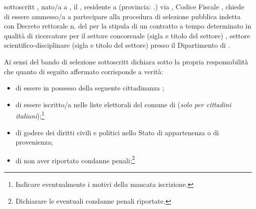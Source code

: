 \documentclass[a4paper,10pt]{article}
\begin{document}
\begin{Form}


\myTextField[.5cm]{} sottoscritt\myTextField[.5cm]{} \myTextField[4cm]{}, 
nato/a a \myTextField{}, il \myTextField{}, residente a \myTextField{} 
(provincia: \myTextField{}.) via \myTextField{}, Codice Fiscale 
\myTextField[4cm]{}, chiede di essere ammesso/a a partecipare alla procedura 
di selezione pubblica indetta con Decreto rettorale n. \myTextField{} del 
\myTextField{} per la stipula di un contratto a tempo determinato in qualità 
di ricercatore per il settore concorsuale (sigla e titolo del settore) \myTextField{}, 
settore scientifico-disciplinare (sigla e titolo  del settore) \myTextField{} 
presso il Dipartimento di \myTextField[4cm]{}.

Ai sensi del bando di selezione  \myTextField[.5cm]{} sottoscritt\myTextField[.5cm]{} 
dichiara sotto la propria responsabilità che quanto di seguito affermato 
corrisponde a verità:
\begin{itemize}
 \item di essere in possesso della seguente cittadinanza \myTextField{};
\item di essere iscritto/a nelle liste elettorali del comune di \myTextField{} 
(\emph{solo per cittadini italiani});\footnote{Indicare eventualmente i motivi 
della mancata iscrizione.}

\myTextField[.9\textwidth]{}
\item di godere dei diritti civili e politici nello Stato di appartenenza o di 
provenienza;
\item di non aver riportato condanne penali;\footnote{Dichiarare le eventuali 
condanne penali riportate.}


\end{itemize}
\end{Form}
\end{document}
